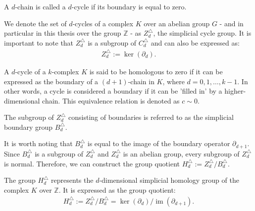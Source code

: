\begin{definition}[$d$-cycle]{\cite[\S 2, p.106]{hatcher2005algebraic}}
	A $d$-chain is called a $d$-cycle if its boundary is equal to zero.
\end{definition}

We denote the set of \( d \)-cycles of a complex \( K \) over an abelian group $G$ - and in particular in this thesis over the group \( \mathbb{Z} \) - as \( Z^{\triangle}_{d} \), the simplicial cycle group. It is important to note that \( Z^{\triangle}_{d} \) is a subgroup of \( C^{\triangle}_{d} \) and can also be expressed as:
\begin{align}
	Z^{\triangle}_{d} := \ker(\partial_{d}). 
\end{align}

A \( d \)-cycle of a \( k \)-complex \( K \) is said to be homologous to zero if it can be expressed as the boundary of a \( (d+1) \)-chain in \( K \), where \( d = 0, 1, \ldots, k-1 \). In other words, a cycle is considered a boundary if it can be 'filled in' by a higher-dimensional chain. This equivalence relation is denoted as \( c \sim 0 \).

\begin{definition}{\cite[\S 2.3]{zomorodian2004computing}}
	The subgroup of $Z^{\triangle}_{d}$ consisting of boundaries is referred to as the simplicial boundary group $B^{\triangle}_{d}$.
\end{definition}

It is worth noting that \( B^{\triangle}_{d} \) is equal to the image of the boundary operator \( \partial_{d+1} \). Since \( B^{\triangle}_{d} \) is a subgroup of \( Z^{\triangle}_{d} \) and \( Z^{\triangle}_{d} \) is an abelian group, every subgroup of \( Z^{\triangle}_{d} \) is normal. Therefore, we can construct the group quotient $H^{\triangle}_{d} := Z^{\triangle}_{d} / B^{\triangle}_{d}$. 

\begin{definition}{\cite[\S 2, p.106]{hatcher2005algebraic}} 
	The group \( H^{\triangle}_{d} \) represents the \( d \)-dimensional simplicial homology group of the complex \( K \) over \( \mathbb{Z} \). It is expressed as the group quotient:
	\begin{align}
		H^{\triangle}_{d} := Z^{\triangle}_{d} / B^{\triangle}_{d} = \ker(\partial_{d}) / \operatorname{im}(\partial_{d+1}). 
	\end{align}
\end{definition}

